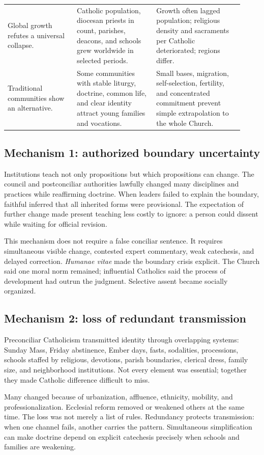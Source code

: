 \begin{longtable}{>{\bfseries\raggedright\arraybackslash}p{0.27\linewidth}>{\raggedright\arraybackslash}p{0.31\linewidth}>{\raggedright\arraybackslash}p{0.34\linewidth}}
Global growth refutes a universal collapse. & Catholic population, diocesan priests in count, parishes, deacons, and schools grew worldwide in selected periods. & Growth often lagged population; religious density and sacraments per Catholic deteriorated; regions differ.\\
Traditional communities show an alternative. & Some communities with stable liturgy, doctrine, common life, and clear identity attract young families and vocations. & Small bases, migration, self-selection, fertility, and concentrated commitment prevent simple extrapolation to the whole Church.\\
\bottomrule
\end{longtable}

\subsection{Mechanism 1: authorized boundary uncertainty}

Institutions teach not only propositions but which propositions can change. The council and postconciliar authorities lawfully changed many disciplines and practices while reaffirming doctrine. When leaders failed to explain the boundary, faithful inferred that all inherited forms were provisional. The expectation of further change made present teaching less costly to ignore: a person could dissent while waiting for official revision.

This mechanism does not require a false conciliar sentence. It requires simultaneous visible change, contested expert commentary, weak catechesis, and delayed correction. \emph{Humanae vitae} made the boundary crisis explicit. The Church said one moral norm remained; influential Catholics said the process of development had outrun the judgment. Selective assent became socially organized.

\subsection{Mechanism 2: loss of redundant transmission}

Preconciliar Catholicism transmitted identity through overlapping systems: Sunday Mass, Friday abstinence, Ember days, fasts, sodalities, processions, schools staffed by religious, devotions, parish boundaries, clerical dress, family size, and neighborhood institutions. Not every element was essential; together they made Catholic difference difficult to miss.

Many changed because of urbanization, affluence, ethnicity, mobility, and professionalization. Ecclesial reform removed or weakened others at the same time. The loss was not merely a list of rules. Redundancy protects transmission: when one channel fails, another carries the pattern. Simultaneous simplification can make doctrine depend on explicit catechesis precisely when schools and families are weakening.

